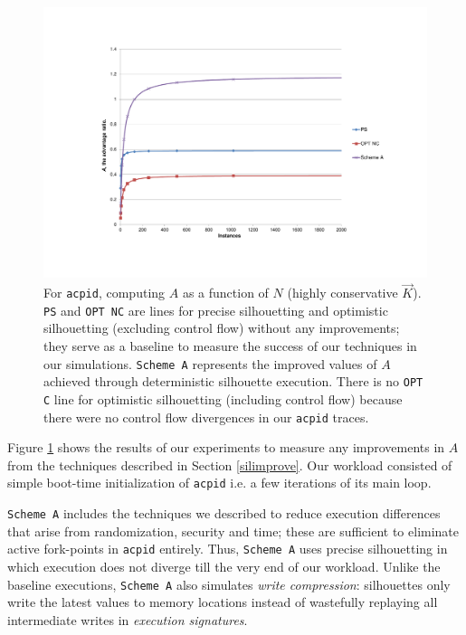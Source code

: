 \begin{figure}[h]
  \center
  \includegraphics[scale=0.80, trim=5cm 3cm 0cm 3cm]{acpid-1.pdf}
  \caption[For \texttt{acpid}, $A$ as a function of $N$ (highly conservative $\vec K$)]%
          {
            For \texttt{acpid}, computing $A$ as a function of $N$ (highly conservative $\vec K$).\newline
            \texttt{PS} and \texttt{OPT NC} are lines for precise silhouetting and optimistic 
            silhouetting (excluding control flow) without any improvements; they
            serve as a baseline to measure the success of our techniques
            in our simulations. \texttt{Scheme A} represents the improved values of $A$
            achieved through deterministic silhouette execution. There is no
            \texttt{OPT C} line for optimistic silhouetting (including 
            control flow) because there were no control flow divergences 
            in our \texttt{acpid} traces.
          }
  \label{acpid1}
\end{figure}

\newpage
\noindent Figure \ref {acpid1} shows the results of our experiments
to measure any improvements in $A$ from the techniques described in Section \ref{silimprove}.
Our workload consisted of simple boot-time initialization of \texttt{acpid}
i.e. a few iterations of its main loop. 

\texttt{Scheme A} includes the techniques we described to reduce
execution differences that arise from randomization, security and time;
these are sufficient to eliminate active fork-points in \texttt{acpid}
entirely. Thus, \texttt{Scheme A} uses precise silhouetting
in which execution does not diverge till the very end of our workload.
Unlike the baseline executions, \texttt{Scheme A} also simulates {\em write compression}:
silhouettes only write the latest values to memory locations instead of wastefully
replaying all intermediate writes  in {\em execution signatures}.

